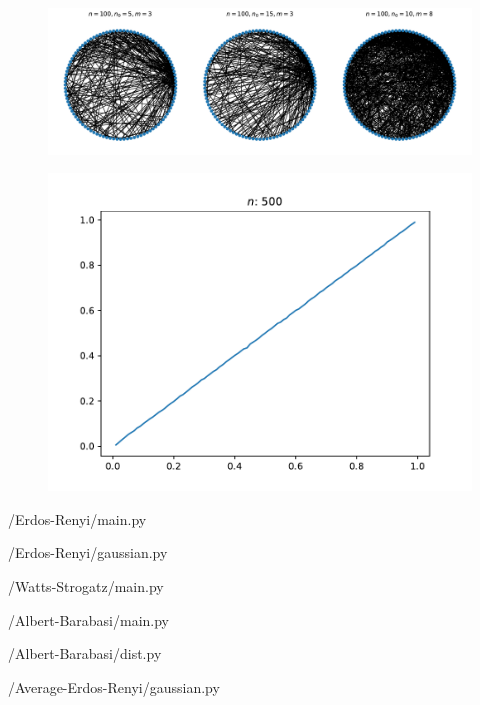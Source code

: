 \documentclass[a4paper, 12pt]{article}
\begin{document}
\begin{figure}[h!]
    \includegraphics[width=\linewidth]{../Albert-Barabasi/graphs.pdf}
\end{figure}

\newpage

\begin{figure}[h!]
    \includegraphics[width=\linewidth]{../Average-Erdos-Renyi/clustering.pdf}
\end{figure}

/Erdos-Renyi/main.py

\newpage

/Erdos-Renyi/gaussian.py

\newpage

/Watts-Strogatz/main.py

\newpage

/Albert-Barabasi/main.py

\newpage

/Albert-Barabasi/dist.py

\newpage

/Average-Erdos-Renyi/gaussian.py

\newpage
\end{document}
